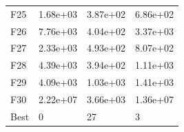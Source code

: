 \begin{table}[H]
\begin{minipage}{.5\linewidth}
\begin{tabular}{llll}
            F25  &  1.68e+03 &  3.87e+02 &  6.86e+02 \\
            F26  &  7.76e+03 &  4.04e+02 &  3.37e+03 \\
            F27  &  2.33e+03 &  4.93e+02 &  8.07e+02 \\
            F28  &  4.39e+03 &  3.94e+02 &  1.11e+03 \\
            F29  &  4.09e+03 &  1.03e+03 &  1.41e+03 \\
            F30  &  2.22e+07 &  3.66e+03 &  1.36e+07 \\
            Best &         0 &        27 &         3 \\
            \bottomrule
            \end{tabular}
            
    \end{minipage} 
\end{table}

